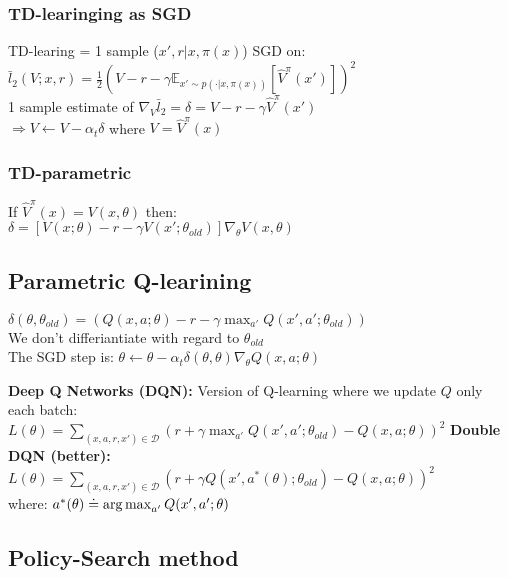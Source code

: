 \subsubsection{TD-learinging as SGD}
TD-learing = 1 sample ($x', r \vert x, \pi(x)$) SGD on:\\
$\bar{l}_2(V;x,r) = \frac{1}{2}\left(V-r-\gamma\mathbb{E}_{x'\sim p(\cdot\vert x, \pi(x))}\left[\hat{V}^\pi(x')\right]\right)^2$\\
1 sample estimate of $\nabla_V \bar{l}_2 = \delta = V-r-\gamma \hat{V}^\pi(x')$\\
$\Rightarrow V\gets V - \alpha_t \delta$ where $V = \hat{V}^\pi(x)$

\subsubsection{TD-parametric}
If $\hat{V}^\pi(x) = V(x,\theta)$ then: \\
$\delta = \left[ V(x;\theta)-r-\gamma V(x';\theta_{old})\right] \nabla_\theta V(x,\theta)$

\subsection{Parametric Q-learining}
$\delta (\theta, \theta_{old}) = \left(Q(x,a;\theta)-r-\gamma\max_{a'} Q(x',a';\theta_{old})\right)$\\
We don't differiantiate with regard to $\theta_{old}$\\
The SGD step is:
$\theta \gets \theta - \alpha_t \delta(\theta, \theta) \nabla_\theta Q(x,a;\theta)$

\textbf{Deep Q Networks (DQN):} Version of Q-learning where we update $Q$ only each batch:\\
{\scriptsize $L(\theta) = \sum_{(x,a,r,x')\in\mathcal{D}}\left(r+\gamma\max_{a'}Q(x',a';\theta_{old})-Q(x,a;\theta)\right)^2$}
\textbf{Double DQN (better):} \\
{\scriptsize $L(\theta) = \sum_{(x,a,r,x')\in\mathcal{D}}\left(r+\gamma Q(x',a^*(\theta);\theta_{old})-Q(x,a;\theta)\right)^2$}\\
where: $a^*(\theta) \doteq \operatorname*{arg\,max}_{a'}Q(x',a'; \theta)$\\
\subsection{Policy-Search method}



